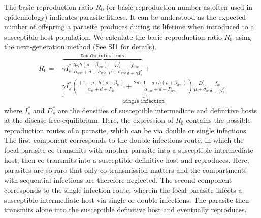 \documentclass[a4paper]{scrartcl} %
\providecommand{\DIFaddbegin}{} %
\providecommand{\DIFaddend}{} %
\providecommand{\DIFdelbegin}{} %
\providecommand{\DIFdelend}{} %
\newcommand{\DIFscaledelfig}{0.5}
\newlength{\DIFdelgraphicswidth} %
\newlength{\DIFdelgraphicsheight} %
\newcommand{\DIFaddincludegraphics}[2][]{{\color{blue}\fbox{\DIFOincludegraphics[#1]{#2}}}} %
\newcommand{\DIFdelincludegraphics}[2][]{%
\sbox{\DIFdelgraphicsbox}{\DIFOincludegraphics[#1]{#2}}%
\settoboxwidth{\DIFdelgraphicswidth}{\DIFdelgraphicsbox} %
\settoboxtotalheight{\DIFdelgraphicsheight}{\DIFdelgraphicsbox} %
\scalebox{\DIFscaledelfig}{%
\parbox[b]{\DIFdelgraphicswidth}{\usebox{\DIFdelgraphicsbox}\\[-\baselineskip] \rule{\DIFdelgraphicswidth}{0em}}\llap{\resizebox{\DIFdelgraphicswidth}{\DIFdelgraphicsheight}{%
\setlength{\unitlength}{\DIFdelgraphicswidth}%
\begin{picture}(1,1)%
\thicklines\linethickness{2pt} %
{\color[rgb]{1,0,0}\put(0,0){\framebox(1,1){}}}%
{\color[rgb]{1,0,0}\put(0,0){\line( 1,1){1}}}%
{\color[rgb]{1,0,0}\put(0,1){\line(1,-1){1}}}%
\end{picture}%
}\hspace*{3pt}}} %
} %
\DeclareRobustCommand{\DIFaddbegin}{\DIFOaddbegin \let\includegraphics\DIFaddincludegraphics} %
\DeclareRobustCommand{\DIFaddend}{\DIFOaddend \let\includegraphics\DIFOincludegraphics} %
\DeclareRobustCommand{\DIFdelbegin}{\DIFOdelbegin \let\includegraphics\DIFdelincludegraphics} %
\DeclareRobustCommand{\DIFdelend}{\DIFOaddend \let\includegraphics\DIFOincludegraphics} %
\begin{document}
The basic reproduction ratio $R_0$ (or basic reproduction number as often used in epidemiology) indicates parasite fitness. 
It can be understood as the expected number of offspring a parasite produces during its lifetime when introduced to a susceptible host population. 
We calculate the basic reproduction ratio $R_0$ using the next-generation method \citep{Diekmann1990, Diekmann2009, hurford:JRSI:2010} (See SI1 for details).
%
\begin{align}
R_0 = & \DIFdelbegin %
\DIFdelend \DIFaddbegin \overbrace{\gamma I_s^* \frac{2 p q h (\rho +  \beta_{ww})}{\alpha_{ww} + d + P_{ww}} \frac{D_s^*}{\mu +\sigma_{ww}} \frac{f_{ww}}{\delta +\gamma I_s^*}}\DIFaddend ^{ \texttt{Double infections}} + \nonumber \\
& \DIFdelbegin %
\DIFdelend \DIFaddbegin \underbrace{\gamma  I_s^* \left( \frac{ (1-p) h (\rho + \beta_w)}{\alpha_w + d + P_w} + \frac{2 p (1-q) h (\rho + \beta_{ww})}{\alpha_{ww} + d + P_{ww}} \right) \frac{D_s^*}{\mu + \sigma_w} \frac{f_w}{\delta +\gamma  I_s^*}}\DIFaddend _{\texttt{Single infection}}
\end{align}
%
where $I_s^*$ and $D_s^*$ are the densities of susceptible intermediate and definitive hosts at the disease-free equilibrium. 
Here, the expression of $R_0$ contains the possible reproduction routes of a parasite, which can be via double or single infections. 
The first component corresponds to the double infections route, in which the focal parasite co-transmits with another parasite into a susceptible intermediate host, then co-transmits into a susceptible definitive host and reproduces. 
Here, parasites are so rare that only co-transmission matters and the compartments with sequential infections are therefore neglected. 
The second component corresponds to the single infection route, wherein the focal parasite infects a susceptible intermediate host via single or double infections. 
The parasite then transmits alone into the susceptible definitive host and eventually reproduces. 
\end{document}
